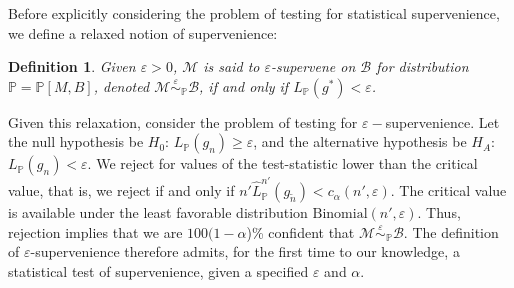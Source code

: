 \documentclass{article}
\newcommand{\mB}{\mathcal{B}}
\newcommand{\mM}{\mathcal{M}}
\newcommand{\PP}{\mathbb{P}}           %
\newcommand{\eps}{\varepsilon}
\providecommand{\mc}[1]{\mathcal{#1}}
\providecommand{\mt}[1]{\widetilde{#1}}
\newcommand{\hL}{\widehat{L}}
\newcommand{\MeB}{\mM \overset{\varepsilon}{{\sim}}_{\PP} \mB}
\newtheorem{defi}{Definition}
\begin{document}
Before explicitly considering the problem of testing for statistical supervenience, we define a relaxed notion of supervenience:
\begin{defi}
\label{def2}
Given $\varepsilon > 0$, $\mM$ is said to $\varepsilon$-\textit{supervene} on $\mB$ for distribution $\PP=\PP[M,B]$, denoted $\MeB$, if and only if $L_{\PP}(g^*) < \varepsilon$.
\end{defi}

Given this relaxation, consider the problem of testing for $\eps-$supervenience.  %
Let the null hypothesis be $H_0$: $L_{\PP}(g_n) \geq \eps$, and the alternative hypothesis be $H_A$: $L_{\PP}(g_n) < \eps$.  We reject for  values of the test-statistic lower than the critical value, that is, we reject if and only if $n' \hL^{n'}_{\PP}(g_{\mt{n}}) <c_{\alpha}(n',\varepsilon)$.  The critical value is available under the least favorable distribution $\text{Binomial}(n',\varepsilon)$.  Thus, rejection implies that we are $100(1-\alpha$)\% confident that $\MeB$.  The definition of $\eps$-supervenience therefore admits, for the first time to our knowledge, a statistical test of supervenience, given a specified $\eps$ and $\alpha$. %



	
	
\end{document}

